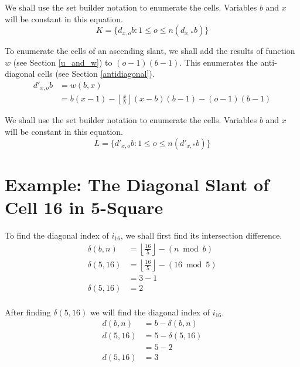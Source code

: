 \documentclass[twoside,openany,12pt]{book}
\begin{document}
    We shall use the set builder notation to enumerate the cells. Variables $b$ and $x$ will be constant in this equation.
    \begin{equation}
        K = \{ d_{x,o}b : 1 \leq o \leq n(d_{x,*}b) \}
    \end{equation}

    To enumerate the cells of an ascending slant, we shall add the results of function $w$ (see Section \ref{u_and_w}) to $(o-1)(b-1)$. This enumerates the anti-diagonal cells (see Section \ref{antidiagonal}).
    \begin{equation}
        \begin{split}
            d'_{x,o}b &= w(b,x) \\
                &= b(x - 1) - \left\lfloor \frac{x}{b} \right\rfloor(x - b)(b - 1) - (o-1)(b-1)
        \end{split}
    \end{equation}

    We shall use the set builder notation to enumerate the cells. Variables $b$ and $x$ will be constant in this equation.
    \begin{equation}
        L = \{ d'_{x,o}b : 1 \leq o \leq n(d'_{x,*}b) \}
    \end{equation}

    \section{Example: The Diagonal Slant of Cell 16 in 5-Square} \label{3-4_example_1}
    To find the diagonal index of $i_{16}$, we shall first find its intersection difference.
    \begin{equation*}
        \begin{split}
            \delta(b,n) &= \left\lfloor \frac{16}{5} \right\rfloor - (n\bmod b)\\
            \delta(5,16) &= \left\lfloor \frac{16}{5} \right\rfloor - (16\bmod 5)\\
                &= 3 - 1\\
            \delta(5,16) &= 2\\
        \end{split}
    \end{equation*}

    After finding $\delta(5,16)$ we will find the diagonal index of $i_{16}$.
    \begin{equation*}
        \begin{split}
            d(b,n) &= b - \delta(b,n)\\
            d(5,16) &= 5 - \delta(5,16)\\
                &= 5 - 2\\
            d(5,16) &= 3\\
        \end{split}
    \end{equation*}
\end{document}
